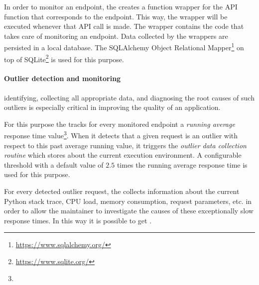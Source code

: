 \documentclass{sig-alternate-05-2015}
\begin{document}
  In order to monitor an endpoint, the \tool creates a function wrapper for the API function that corresponds to the endpoint. This way, the wrapper will be executed whenever that API call is made. The wrapper contains the code that takes care of monitoring an endpoint. Data collected by the wrappers are persisted in a local database. The SQLAlchemy Object Relational Mapper\footnote{\url{https://www.sqlalchemy.org/}} on top of SQLite\footnote{\url{https://www.sqlite.org/}} is used for this purpose.
  
  \paragraph{Outlier detection and monitoring}
  
   identifying, collecting all appropriate data, and diagnosing the root causes of such outliers is especially critical in improving the quality of an application. 
  
  
  For this purpose the \tool tracks for every monitored endpoint a {\em running average} response time value\footnote{}. When it detects that a given request is an outlier with respect to this past average running value, it triggers the {\em outlier data collection routine} which stores  about the current execution environment. A configurable threshold with a default value of $2.5$ times the running average response time is used for this purpose. 

  For every detected outlier request, the \tool collects information about the current Python stack trace, CPU load, memory consumption, request parameters, etc. in order to allow the maintainer to investigate the causes of these exceptionally slow response times. In this way it is possible to get .
  
\end{document}
